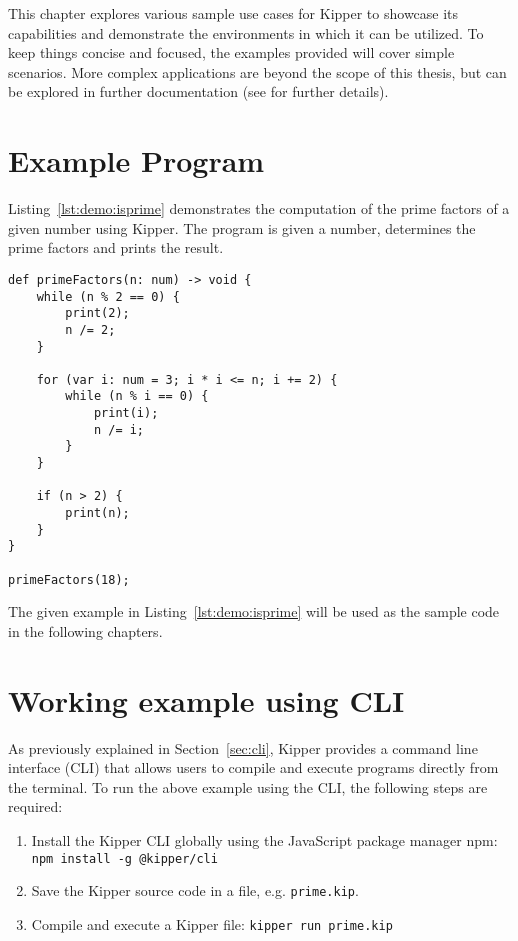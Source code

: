 
This chapter explores various sample use cases for Kipper to showcase its capabilities and demonstrate the environments in which it can be utilized. To keep things concise and focused, the examples provided will cover simple scenarios. More complex applications are beyond the scope of this thesis, but can be explored in further documentation (see  for further details).

\section{Example Program}

Listing~\ref{lst:demo:isprime} demonstrates the computation of the prime factors of a given number using Kipper. The program is given a number, determines the prime factors and prints the result.

\begin{lstlisting}[language=Kipper,caption=A basic programs that determines the prime factors of an integer, label=lst:demo:isprime]
def primeFactors(n: num) -> void {
	while (n % 2 == 0) {
		print(2);
		n /= 2;
	}
	
	for (var i: num = 3; i * i <= n; i += 2) {
		while (n % i == 0) {
			print(i);
			n /= i;
		}
	}
	
	if (n > 2) {
		print(n);
	}
}

primeFactors(18);
\end{lstlisting}

The given example in Listing~\ref{lst:demo:isprime} will be used as the sample code in the following chapters.

\section{Working example using CLI}

As previously explained in Section~\ref{sec:cli}, Kipper provides a command line interface (CLI) that allows users to compile and execute programs directly from the terminal. To run the above example using the CLI, the following steps are required:

\begin{enumerate}
	\item Install the Kipper CLI globally using the JavaScript package manager npm: \lstinline|npm install -g @kipper/cli|
	\item Save the Kipper source code in a file, e.g. \texttt{prime.kip}.
	\item Compile and execute a Kipper file: \lstinline|kipper run prime.kip|
\end{enumerate}

